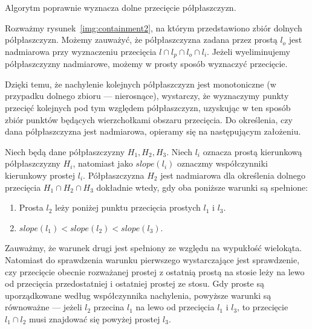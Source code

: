 \begin{lemat}\emph{\cite{Chazelle83}}
  Algorytm poprawnie wyznacza dolne przecięcie półpłaszczyzn.
\end{lemat}

Rozważmy rysunek~\ref{img:containment2}, na którym przedstawiono zbiór
dolnych półpłaszczyzn. Możemy zauważyć, że półpłaszczyzna zadana przez
prostą $l_o$ jest nadmiarowa przy wyznaczeniu przecięcia $l \cap l_p
\cap l_o \cap l_i$. Jeżeli wyeliminujemy półpłaszczyzny nadmiarowe,
możemy w prosty sposób wyznaczyć przecięcie.

Dzięki temu, że nachylenie kolejnych półpłaszczyzn jest monotoniczne
(w przypadku dolnego zbioru --- nierosnące), wystarczy, że wyznaczymy
punkty przecięć kolejnych pod tym względem półpłaszczyzn, uzyskując w
ten sposób zbiór punktów będących wierzchołkami obszaru przecięcia. Do
określenia, czy dana półpłaszczyzna jest nadmiarowa, opieramy się na
następującym założeniu.

\begin{lemat}\emph{\cite{Brown78}}
  Niech będą dane półpłaszczyzny $H_1, H_2, H_3$. Niech $l_i$ oznacza
  prostą kierunkową półpłaszczyzny $H_i$, natomiast jako $slope(l_i)$
  oznaczmy współczynniki kierunkowy prostej $l_i$. Półpłaszczyzna
  $H_2$ jest nadmiarowa dla określenia dolnego przecięcia $H_1 \cap
  H_2 \cap H_3$ dokładnie wtedy, gdy oba poniższe warunki są
  spełnione:

  \begin{enumerate}
    \item Prosta $l_2$ leży poniżej punktu przecięcia prostych $l_1$ i
      $l_3$.
    \item $slope(l_1) < slope(l_2) < slope(l_3)$.
  \end{enumerate}
\end{lemat}

Zauważmy, że warunek drugi jest spełniony ze względu na wypukłość
wielokąta. Natomiast do sprawdzenia warunku pierwszego wystarczające
jest sprawdzenie, czy przecięcie obecnie rozważanej prostej z ostatnią
prostą na stosie leży na lewo od przecięcia przedostatniej i ostatniej
prostej ze stosu. Gdy proste są uporządkowane według współczynnika
nachylenia, powyższe warunki są równoważne --- jeżeli $l_2$ przecina
$l_1$ na lewo od przecięcia $l_1$ i $l_3$, to przecięcie $l_1 \cap
l_2$ musi znajdować się powyżej prostej $l_3$.

